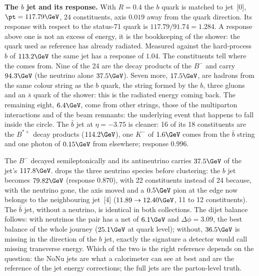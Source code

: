 \textbf{The $b$ jet and its response.} With $R=0.4$ the $b$ quark is matched to jet~[0], $\pt=117.79\GeV$,
24 constituents, axis $0.019$ away from the quark direction. Its response with respect to the status-71 quark
is $117.79/91.74=1.284$. A response above one is not an excess of energy, it is the bookkeeping of the
shower: the quark used as reference has already radiated. Measured against the hard-process $b$ of
$113.2\GeV$ the same jet has a response of $1.04$. The constituents tell where the \pt{} comes from. Nine of
the 24 are the decay products of the $B^-$ and carry $94.3\GeV$ (the neutrino alone $37.5\GeV$). Seven more,
$17.5\GeV$, are hadrons from the same colour string as the $b$ quark, the string formed by the $b$, three
gluons and an $\bar s$ quark of the shower: this is the radiated energy coming back. The remaining eight,
$6.4\GeV$, come from other strings, those of the multiparton interactions and of the beam remnants: the
underlying event that happens to fall inside the circle. The $\bar b$ jet at $\eta=-3.75$ is cleaner: 16 of
its 18 constituents are the $B^{*+}$ decay products ($114.2\GeV$), one $K^-$ of $1.6\GeV$ comes from the
$\bar b$ string and one photon of $0.15\GeV$ from elsewhere; response $0.996$.

\begin{plainwords}
The $B^-$ decayed semileptonically and its antineutrino carries $37.5\GeV$ of the jet's $117.8\GeV$.
 drops the three neutrino species before clustering: the $b$ jet becomes
$79.82\GeV$ (response $0.870$), with 22 constituents instead of 24 because, with the neutrino gone, the axis
moved and a $0.5\GeV$ pion at the edge now belongs to the neighbouring jet~[4] ($11.89\to12.40\GeV$, 11 to 12
constituents). The $\bar b$ jet, without a neutrino, is identical in both collections. The dijet balance
follows: with neutrinos the pair has a net \pt{} of $6.1\GeV$ and $\Delta\phi=3.09$, the best balance of the
whole journey ($25.1\GeV$ at quark level); without, $36.5\GeV$ is missing in the direction of the $b$ jet,
exactly the signature a detector would call missing transverse energy. Which of the two is the right reference
depends on the question: the NoNu jets are what a calorimeter can see at best and are the reference of the
jet energy corrections; the full jets are the parton-level truth.
\end{plainwords}

